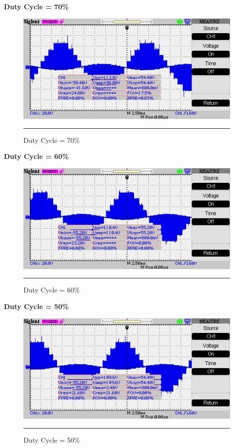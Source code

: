 \textbf{Duty Cycle = 70\%}
\begin{figure}[htbp]
	\centering
	\includegraphics[width = 6in]{./Figures/Photos/Hardware/36}
	\rule{35em}{1pt}
	\caption{Duty Cycle = 70\%}
\end{figure}


\textbf{Duty Cycle = 60\%}
\begin{figure}[htbp]
	\centering
	\includegraphics[width = 6in]{./Figures/Photos/Hardware/37}
	\rule{35em}{1pt}
	\caption{Duty Cycle = 60\%}
\end{figure}

\newpage
\textbf{Duty Cycle = 50\%}
\begin{figure}[htbp]
	\centering
	\includegraphics[width = 6in]{./Figures/Photos/Hardware/38}
	\rule{35em}{1pt}
	\caption{Duty Cycle = 50\%}
\end{figure}

